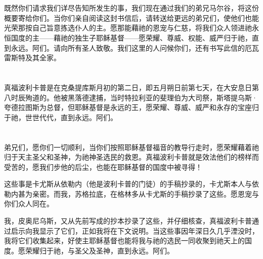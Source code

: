 
\section{}

既然你们请求我们详尽告知所发生的事，我们现在通过我们的弟兄马尔谷，将这份概要寄给你们。当你们亲自阅读这封书信后，请转送给更远的弟兄们，使他们也能光荣那按自己旨意拣选仆人的主。愿那能藉祂的恩宠与仁慈，将我们众人领进祂永恒国度的主——藉祂的独生子耶稣基督——愿荣耀、尊威、权能、威严归于祂，直到永远。阿们。请向所有圣人致敬。我们这里的人问候你们，还有书写此信的厄瓦雷斯特及其全家。\par


\section{}

真福波利卡普是在克桑提库斯月初的第二日，即五月朔日前第七天，在大安息日第八时辰殉道的。他被黑落德逮捕，当时特拉利亚的斐理伯为大司祭，斯塔提乌斯·夸德拉图斯为总督，但耶稣基督是永远的王，愿荣耀、尊威、威严和永存的宝座归于祂，世世代代，直到永远。阿们。\par


\section{}

弟兄们，愿你们一切顺利，当你们按照耶稣基督福音的教导行走时，愿荣耀藉着祂归于天主圣父和圣神，为祂神圣选民的救恩。真福波利卡普就是效法他们的榜样而受苦的，愿我们步他的后尘，也能在耶稣基督的国度中被寻得！\par

这些事是卡尤斯从依勒内（他是波利卡普的门徒）的手稿抄录的，卡尤斯本人与依勒内甚为亲密。而我，苏格拉底，在格林多从卡尤斯的手稿抄录了这些。愿恩宠与你们众人同在。\par

我，皮奥尼乌斯，又从先前写成的抄本抄录了这些，并仔细核查，真福波利卡普通过启示向我显示了它们，正如我将在下文说明。当这些事因年深日久几乎湮没时，我将它们收集起来，好使主耶稣基督也能将我与祂的选民一同收聚到祂天上的国度。愿荣耀归于祂，与圣父及圣神，直到永远。阿们。\par

